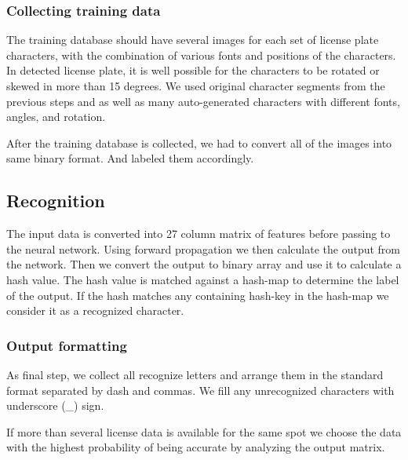 \documentclass{standalone}
\begin{document}
\subsubsection{Collecting training data}
The training database should have several images for each set of license plate characters, with the combination of various fonts and positions of the characters. In detected license plate, it is well possible for the characters to be rotated or skewed in more than 15 degrees. We used original character segments from the previous steps and as well as many auto-generated characters with different fonts, angles, and rotation. 

After the training database is collected, we had to convert all of the images into same binary format. And labeled them accordingly. 

\subsection{Recognition}
The input data is converted into 27 column matrix of features before passing to the neural network. Using forward propagation we then calculate the output from the network. Then we convert the output to binary array and use it to calculate a hash value. The hash value is matched against a hash-map to determine the label of the output. If the hash matches any containing hash-key in the hash-map we consider it as a recognized character. 

\subsubsection{Output formatting}
    As final step, we collect all recognize letters and arrange them in the standard format separated by dash and commas. We fill any unrecognized characters with underscore (\_) sign.
    
    If more than several license data is available for the same spot we choose the data with the highest probability of being accurate by analyzing the output matrix.
\end{document}
